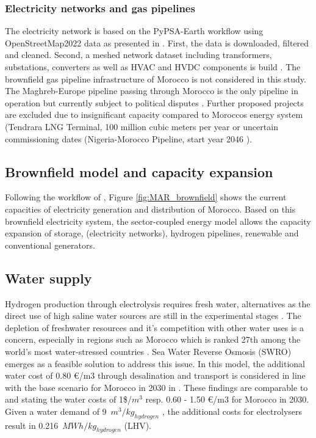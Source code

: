 \subsubsection{Electricity networks and gas pipelines}
The electricity network is based on the PyPSA-Earth workflow using OpenStreetMap2022 data \cite{OpenStreetMap2022} as presented in \cite{Parzen2023}. First, the data is downloaded, filtered and cleaned. Second, a meshed network dataset including transformers, substations, converters as well as HVAC and HVDC components is build \cite{Parzen2023}. 
The brownfield gas pipeline infrastructure of Morocco is not considered in this study. The Maghreb-Europe pipeline passing through Morocco is the only pipeline in operation but currently subject to political disputes \cite{Rachidi2022}. Further proposed projects are excluded due to insignificant capacity compared to Moroccos energy system (Tendrara LNG Terminal, 100 million cubic meters per year %
 or uncertain commissioning dates (Nigeria-Morocco Pipeline, start year 2046 \cite{GEM2023b}).


\subsection{Brownfield model and capacity expansion}
\label{brownfield_model}
Following the workflow of \cite{Parzen2023}, Figure \ref{fig:MAR_brownfield} shows the current capacities of electricity generation and distribution of Morocco. Based on this brownfield electricity system, the sector-coupled energy model allows the capacity expansion of storage, (electricity networks), hydrogen pipelines, renewable and conventional generators.


\subsection{Water supply}
\label{subsec:water_supply}
Hydrogen production through electrolysis requires fresh water, alternatives as the direct use of high saline water sources are still in the experimental stages \cite{Tong2020}. The depletion of freshwater resources and it's competition with other water uses is a concern, especially in regions such as Morocco which is ranked 27th among the world's most water-stressed countries \cite{Maddocks2015}. 
Sea Water Reverse Osmosis (SWRO) emerges as a feasible solution to address this issue. In this model, the additional water cost of 0.80 €/m3 through desalination and transport is considered in line with the base scenario for Morocco in 2030 in \cite{Caldera2020}. These findings are comparable to \cite{Kettani2020} and \cite{Caldera2016} stating the water costs of 1\$/$m^3$ resp. 0.60 - 1.50 €/m3 for Morocco in 2030. Given a water demand of 9~$m^3/kg_{hydrogen}$
\cite{Hampp2023}, the additional costs for electrolysers result in 0.216~$MWh/kg_{hydrogen}$ (LHV).

